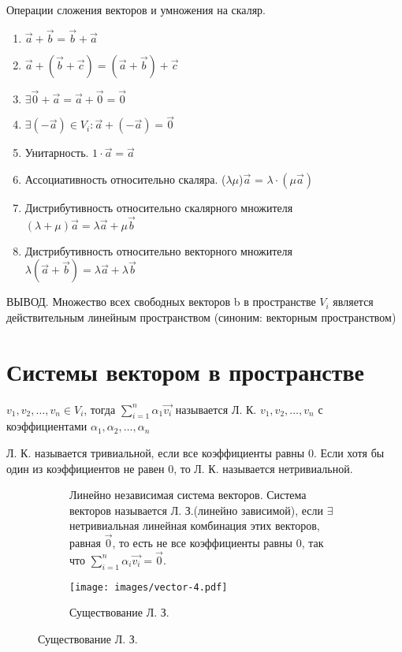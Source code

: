 	\begin{theorem}
		Операции сложения векторов и умножения на скаляр.
		\begin{enumerate}
			\item \(\vec{a}+\vec{b} = \vec{b} + \vec{a}\)
			\item \(\vec{a}+(\vec{b} + \vec{c}) = (\vec{a}+\vec{b}) + \vec{c}\)
			\item \(\exists \vec{0}+\vec{a} = \vec{a}+\vec{0} = \vec{0}\)
			\item \(\exists (-\vec{a}) \in V_i: \vec{a} + (-\vec{a}) = \vec{0}\)
			\item Унитарность. \(1\cdot \vec{a} = \vec{a}\)
			\item Ассоциативность относительно скаляра. (\(\lambda\mu\))$\vec{a}$ = \(\lambda\cdot(\mu\vec{a})\)
			\item Дистрибутивность относительно скалярного множителя \((\lambda + \mu)\vec{a} = \lambda\vec{a}+\mu\vec{b}\)
			\item Дистрибутивность относительно векторного множителя \(\lambda(\vec{a} + \vec{b}) = \lambda \vec{a} + \lambda \vec{b}\)
		\end{enumerate}			
		ВЫВОД. Множество всех свободных векторов b в пространстве \(V_i\) является действительным линейным пространством (синоним: векторным пространством) \\
	\end{theorem}
	\section{Системы вектором в пространстве }
	\begin{definition}
		\(v_1, v_2,\ldots, v_n\in V_i \), тогда \(\sum_{i=1}^{n}\alpha_1\vec{v_i}\) называется Л. К. \(v_1, v_2, \ldots, v_n\) с коэффициентами $\alpha_1, \alpha_2, \ldots, \alpha_n$
	\end{definition}
	Л. К. называется тривиальной, если все коэффициенты равны 0. Если хотя бы один из коэффициентов не равен 0, то Л. К. называется нетривиальной.
	\begin{figure}[h]
		\begin{subfigure}[t!]{0.6\linewidth}
				\begin{definition}
				Линейно независимая система векторов. Система векторов называется Л. З.(линейно зависимой), если $\exists$ нетривиальная линейная комбинация этих векторов, равная $\vec{0}$, то есть не все коэффициенты равны 0, так что \(\sum_{i=1}^{n}\alpha_i\vec{v_i} = \vec{0}\).
			\end{definition}
		\end{subfigure}
		\begin{subfigure}[b!]{0.4\linewidth}
			\centering
			\texttt{[image: images/vector-4.pdf]}
			\caption*{Существование Л. З.}
			\label{Vector4}
		\end{subfigure}
	\end{figure}

